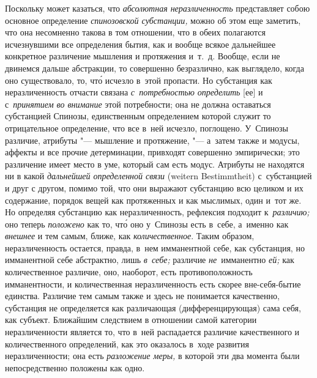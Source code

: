 Поскольку может казаться, что {\em абсолютная неразличенность} представляет
собою основное определение {\em спинозовской субстанции,} можно об этом еще
заметить, что она несомненно такова в том отношении, что в обеих полагаются
исчезнувшими все определения бытия, как и вообще всякое дальнейшее конкретное
различение мышления и протяжения и~т.~д. Вообще, если не двинемся дальше
абстракции, то совершенно безразлично, как выглядело, когда оно существовало,
то, чт\'{о} исчезло в~этой пропасти. Но субстанция как неразличенность отчасти
связана {\em с~потребностью определить} [ее] и с~{\em принятием во внимание}
этой потребности; она не должна оставаться субстанцией Спинозы, единственным
определением которой служит то отрицательное определение, что все в~ней
исчезло, поглощено. У~Спинозы
различие, атрибуты "--- мышление и протяжение, "--- а~затем также и модусы,
аффекты и все прочие детерминации, привходят совершенно эмпирически; это
различение имеет место в уме, который сам есть модус. Атрибуты не находятся ни
в какой {\em дальнейшей определенной связи} (wei\-tern Be\-stimmt\-heit)
с~субстанцией и друг с другом, помимо той, что они выражают субстанцию всю
целиком и их содержание, порядок вещей как протяженных и как мыслимых, один
и~тот же. Но определяя субстанцию как неразличенность, рефлексия подходит
к~{\em различию;} оно теперь {\em положено} как то, чт\'{о} оно у~Спинозы есть
в~себе, а~именно как {\em внешнее} и тем самым, ближе, как
{\em количественное}. Таким образом, неразличенность остается, правда, в~нем
имманентной себе, как субстанция, но имманентной себе абстрактно, лишь
{\em в~себе;} различие {\em не}~имманентно {\em ей;} как количественное
различие, оно, наоборот, есть противоположность имманентности, и количественная
неразличенность есть скорее вне-себя-бытие единства. Различие тем самым также и
здесь не понимается качественно, субстанция не определяется как различающая
(дифференцирующая) сама себя, как субъект. Ближайшим следствием в отношении
самой категории неразличенности является то, что в~ней распадается различие
качественного и количественного определений, как это оказалось в~ходе развития
неразличенности; она есть {\em разложение меры,} в которой эти два момента были
непосредственно положены как одно.

